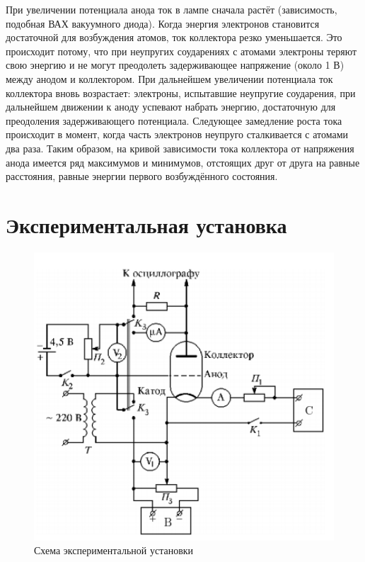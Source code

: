 \documentclass[a4paper,12pt]{article} %
\begin{document}
\noindent При увеличении потенциала анода ток в лампе сначала растёт (зависимость, подобная ВАХ вакуумного диода). Когда энергия электронов становится достаточной для возбуждения атомов, ток коллектора резко уменьшается. Это происходит потому, что при неупругих соударениях с атомами электроны теряют свою энергию и не могут преодолеть задерживающее напряжение (около 1 В) между анодом и коллектором. При дальнейшем увеличении потенциала ток коллектора вновь возрастает: электроны, испытавшие неупругие соударения, при дальнейшем движении к аноду успевают набрать энергию, достаточную для преодоления задерживающего потенциала. Следующее замедление роста тока происходит в момент, когда часть электронов неупруго сталкивается с атомами два раза. Таким образом, на кривой зависимости тока коллектора от напряжения анода имеется ряд максимумов и минимумов, отстоящих друг от друга на равные расстояния, равные энергии первого возбуждённого состояния.

\section{Экспериментальная установка}

\begin{figure}[h]
    \centering
    \includegraphics[width=12cm]{fig3.PNG}
    \caption{Схема экспериментальной установки}
    \label{fig:vac}
\end{figure}
\end{document}
